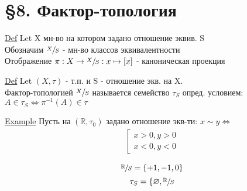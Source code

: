 \documentclass[a4paper]{article}
\begin{document}
\section*{\centering \S 8. Фактор-топология}

\begin{tcolorbox}
\underline{Def} Let X мн-во на котором задано отношение эквив. S\\
Обозначим $ \sfrac{X}{S} $  - мн-во классов эквивалентности\\
Отображение $ \pi: X \to \sfrac{X}{S}: x \mapsto [x] $ - каноническая проекция
\end{tcolorbox}

\begin{tcolorbox}
\underline{Def} Let $ (X,\tau) $ - т.п. и S - отношение экв. на X.\\
Фактор-топологией $ \sfrac{X}{S} $ называется семейство $ \tau_S $ опред. условием:\\
$ A \in \tau_S \iff \pi^{-1}(A) \in \tau $ 
\end{tcolorbox}

\underline{Example} Пусть на $ (\mathbb{R}, \tau_0) $ задано отношение экв-ти:
    $ x \sim y \iff $ \begin{align*}
    \left[
    \begin{array}{ll}
        x > 0, y > 0 \\
        x < 0, y < 0
    \end{array}
    \right .
    \end{align*}

\[
    \sfrac{\mathbb{R}}{S} = \{ +1, -1, 0 \}  
\]
\[
    \tau_S = \{ \varnothing, \sfrac{\mathbb{R}}{S}
\]
\end{document}
